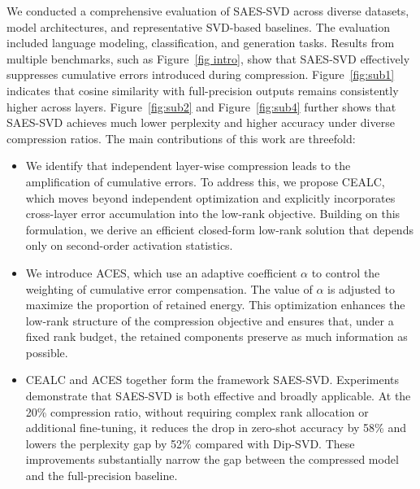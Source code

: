 We conducted a comprehensive evaluation of SAES-SVD across diverse datasets, model architectures, and representative SVD-based baselines. The evaluation included language modeling, classification, and generation tasks. Results from multiple benchmarks, such as Figure~\ref{fig intro}, show that SAES-SVD effectively suppresses cumulative errors introduced during compression. Figure~\ref{fig:sub1} indicates that cosine similarity with full-precision outputs remains consistently higher across layers. Figure~\ref{fig:sub2} and Figure~\ref{fig:sub4} further shows that SAES-SVD achieves much lower perplexity and higher accuracy under diverse compression ratios. 
The main contributions of this work are threefold:
\setlength{\leftmargini}{10pt}
\vspace{-3mm}
\begin{itemize}
    \item
    We identify that independent layer-wise compression leads to the amplification of cumulative errors. To address this, we propose CEALC, which moves beyond independent optimization and explicitly incorporates cross-layer error accumulation into the low-rank objective. Building on this formulation, we derive an efficient closed-form low-rank solution that depends only on second-order activation statistics. 
\vspace{-1mm}
    \item 
    We introduce ACES, which use an adaptive coefficient $\alpha$ to control the weighting of cumulative error compensation. The value of $\alpha$ is adjusted to maximize the proportion of retained energy. This optimization enhances the low-rank structure of the compression objective and ensures that, under a fixed rank budget, the retained components preserve as much information as possible.
\vspace{-1mm}
    \item 
    CEALC and ACES together form the framework SAES-SVD. Experiments demonstrate that SAES-SVD is both effective and broadly applicable. At the 20\% compression ratio, without requiring complex rank allocation or additional fine-tuning, it reduces the drop in zero-shot accuracy by 58\% and lowers the perplexity gap by 52\% compared with Dip-SVD. These improvements substantially narrow the gap between the compressed model and the full-precision baseline.
\end{itemize}

